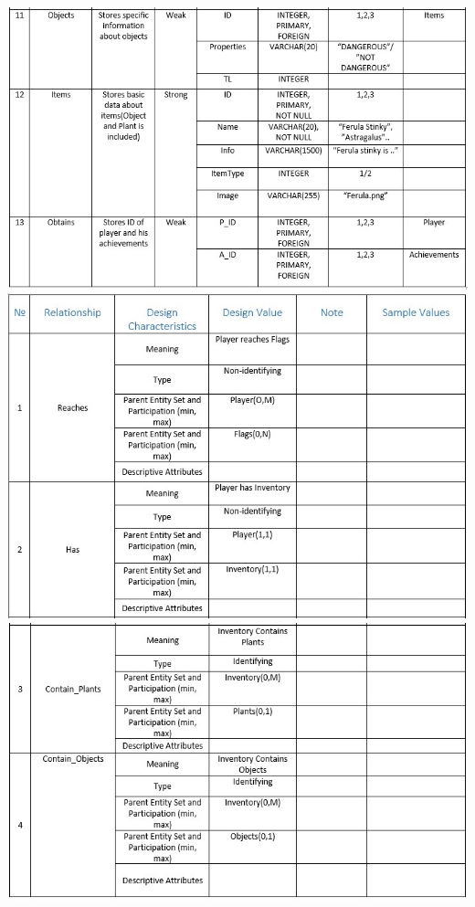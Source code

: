 \documentclass[12pt,a4paper]{article}
\begin{document}
\begin{center}
\bigskip
\includegraphics[scale=0.6]{images/LDR4.jpg}
\includegraphics[scale=0.6]{images/LDR5.jpg}
\includegraphics[scale=0.6]{images/LDR6.jpg}

\end{center}
\end{document}
